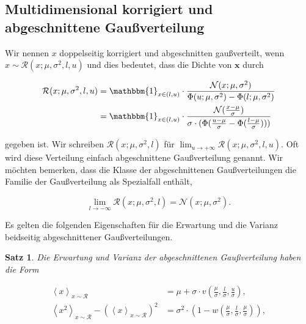 \documentclass[12pt,a4paper]{scrartcl}
\newtheorem{Satz}{Satz}[section]
\numberwithin{equation}{section}
\begin{document}
\subsection{Multidimensional korrigiert und abgeschnittene Gaußverteilung}
Wir nennen $x$ doppelseitig korrigiert und abgeschnitten gaußverteilt, wenn $x \sim \mathcal{R}(x; \mu, \sigma^2, l,u)$ und dies bedeutet, dass die Dichte von $\mathbf{x}$ durch 

\begin{equation}
 \begin{split}
 \mathcal{R}(x; \mu, \sigma^2, l,u) &= \mathbbm{1}_{x \in (l,u)} \cdot \frac{ \mathcal{N}(x; \mu, \sigma^2) }{ \Phi(u; \mu, \sigma^2) - \Phi(l; \mu, \sigma^2)} \\
 &= \mathbbm{1}_{x \in (l,u)} \cdot \frac{ \mathcal{N}(\frac{x- \mu}{\sigma}) }{\sigma \cdot (\Phi(\frac{u-\mu}{\sigma} - \Phi(\frac{l-\mu}{\sigma})))} \\
 \end{split}
 \end{equation}

gegeben ist. Wir schreiben $\mathcal{R}(x; \mu, \sigma^2, l)$ für $\lim_{u \rightarrow + \infty} \mathcal{R}(x; \mu, \sigma^2, l,u)$. Oft wird diese Verteilung einfach
abgeschnittene Gaußverteilung genannt. Wir möchten bemerken, dass die Klasse der abgeschnittenen Gaußverteilungen die Familie der Gaußverteilung als
Spezialfall enthält, 

\begin{equation}
 \lim_{l \rightarrow - \infty} \mathcal{R}(x; \mu, \sigma^2, l) = \mathcal{N}(x;\mu, \sigma^2).
\end{equation}

Es gelten die folgenden Eigenschaften für die Erwartung und die Varianz beidseitig abgeschnittener Gaußverteilungen. 

\begin{Satz}
 Die Erwartung und Varianz der abgeschnittenen Gaußverteilung haben die Form
 
 \begin{equation}
 \begin{split}
  \left< x \right>_{x \sim \mathcal{R}} &= \mu + \sigma \cdot v\left(\frac{\mu}{\sigma}, \frac{l}{\sigma}, \frac{u}{\sigma}\right), \\
  \left< x^2 \right>_{x \sim \mathcal{R}} - ( \left< x \right>_{x \sim \mathcal{R}})^2 &= \sigma^2 \cdot \left( 1 - w \left( \frac{\mu}{\sigma}, \frac{l}{\sigma}, \frac{\mu}{\sigma}\right) \right), \\
 \end{split}
 \end{equation}
\end{Satz}
\end{document}
